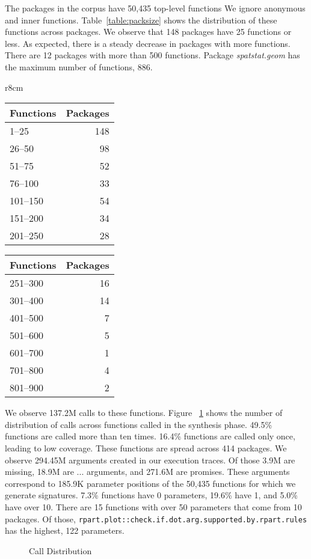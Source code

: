 \documentclass[review,nonacm,screen,acmsmall,anonymous=true]{acmart}
\renewcommand{\c}[1]{\lstinline |#1|\xspace}
\begin{document}
The packages in the corpus have 50,435 top-level functions We ignore anonymous
and inner functions. Table~\ref{table:packsize} shows the distribution of these
functions across packages. We observe that 148 packages have 25 functions or
less. As expected, there is a steady decrease in packages with more functions.
There are 12 packages with more than 500 functions. Package \emph{spatstat.geom}
has the maximum number of functions, 886.

\begin{wraptable}{r}{8cm}
  \vspace{-3mm}
  \small
  \caption{Package Size} \label{table:packsize}
  \centering
  \begin{tabular}{lr}
    \toprule
    \bf Functions&\bf Packages\\
    \midrule
    1--25&148\\
    26--50&98\\
    51--75&52\\
    76--100&33\\
    101--150&54\\
    151--200&34\\
    201--250&28\\
    \bottomrule
  \end{tabular}
  \quad
  \begin{tabular}{lr}
    \toprule
    \bf Functions&\bf Packages\\
    \midrule
    251--300&16\\
    301--400&14\\
    401--500&7\\
    501--600&5\\
    601--700&1\\
    701--800&4\\
    801--900&2\\
    \bottomrule
  \end{tabular}
\end{wraptable}


We observe 137.2M calls to these functions. Figure ~\ref{fig:callDist} shows the
number of distribution of calls across functions called in the synthesis
phase. 49.5\% functions are called more than ten times. 16.4\% functions are
called only once, leading to low coverage. These functions are spread across 414
packages.
We observe 294.45M arguments created in our execution traces. Of those 3.9M are
missing, 18.9M are $...$ arguments, and 271.6M are promises. These arguments
correspond to 185.9K parameter positions of the 50,435 functions for which we
generate signatures.
7.3\% functions have 0 parameters, 19.6\% have 1, and 5.0\% have over 10. There
are 15 functions with over 50 parameters that come from 10 packages. Of those,
\c{rpart.plot::check.if.dot.arg.supported.by.rpart.rules} has the highest, 122
parameters.
%
\begin{figure}[!h]
  \centering
  
  \caption{Call Distribution}
  \label{fig:callDist}
\end{figure}
%
\end{document}
